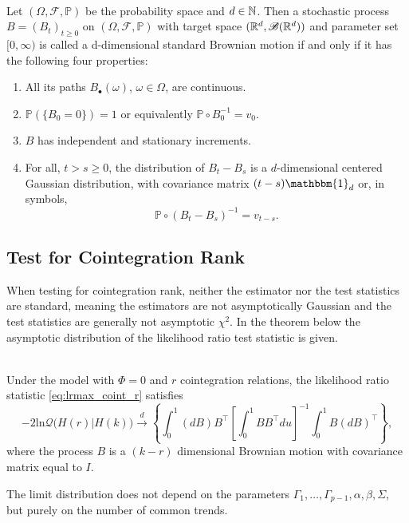 \begin{defi}\phantom{}\\
    Let $(\Omega, \mathscr{F}, \mathbb{P})$ be the probability space and $d\in \mathbb{N}$. Then a stochastic process $B=(B_t)_{t\geq0}$ on $(\Omega, \mathscr{F}, \mathbb{P})$ with target space $(\mathbb{R}^d,\mathscr{B}(\mathbb{R}^d))$ and parameter set $[0,\infty)$ is called a d-dimensional standard Brownian motion if and only if it has the following four properties:
    

\begin{enumerate}
     \item All its paths $B_\bullet(\omega)$, $\omega\in\Omega$, are continuous.
     \item $\mathbb{P}(\{B_0=0\})=1$ or equivalently $\mathbb{P}\circ B_0^{-1}=v_0$.
     \item $B$ has independent and stationary increments.        
     \item  For all, $t > s \geq 0 $, the distribution of $B_t-B_s$ is a $d$-dimensional centered Gaussian distribution, with covariance matrix $(t-s) \mathbbm{1}_d$ or, in symbols, 
     \begin{equation*}
         \mathbb{P}\circ (B_t-B_s)^{-1}=v_{t-s}.
     \end{equation*}
\end{enumerate}
\end{defi}


\subsection{Test for Cointegration Rank}
When testing for cointegration rank, neither the estimator nor the test statistics are standard, meaning the estimators are not asymptotically Gaussian and the test statistics are generally not asymptotic $\chi^2$. In the theorem below the asymptotic distribution of the likelihood ratio test statistic is given.

\begin{thm}\phantom\\
    Under the model with $\Phi=0$ and $r$ cointegration relations, the likelihood ratio statistic \eqref{eq:lrmax_coint_r} satisfies
    \begin{equation*}
        -2 \text{ln}\mathcal{Q} \big( H(r)|H(k) \big) \overset{d}{\rightarrow} \left\{ \int_0^1 (dB)B^{\top} \left[\int_0^1 BB^\top du \right]^{-1} \int_0^1 B(dB)^\top \right\},
    \end{equation*}
    where the process $B$ is a $(k-r)$ dimensional Brownian motion with covariance matrix equal to $I.$
    \label{thm:asymptotic_distribution}
\end{thm}
\noindent The limit distribution does not depend on the parameters $\Gamma_1,\ldots,\Gamma_{p-1},\alpha,\beta,\Sigma$, but purely on the number of common trends.

